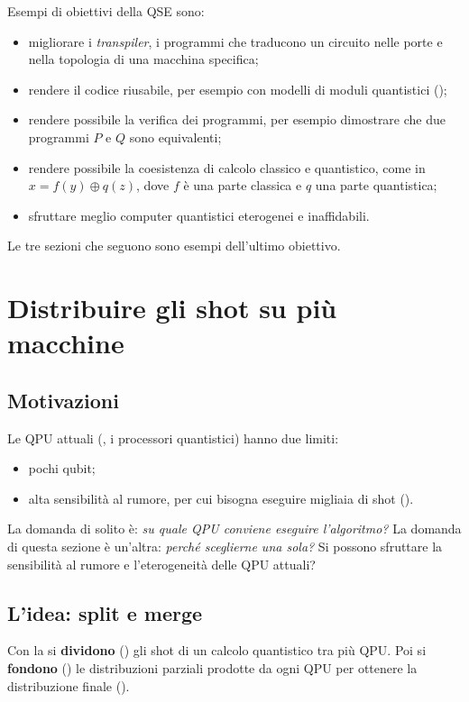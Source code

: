 Esempi di obiettivi della QSE sono:
\begin{itemize}
  \item migliorare i \emph{transpiler}, i programmi che traducono un circuito nelle porte e nella topologia di una
    macchina specifica;
  \item rendere il codice riusabile, per esempio con modelli di moduli quantistici ();
  \item rendere possibile la verifica dei programmi, per esempio dimostrare che due programmi $P$ e $Q$ sono
    equivalenti;
  \item rendere possibile la coesistenza di calcolo classico e quantistico, come in $x = f(y) \oplus q(z)$, dove $f$ è
    una parte classica e $q$ una parte quantistica;
  \item sfruttare meglio computer quantistici eterogenei e inaffidabili.
\end{itemize}
Le tre sezioni che seguono sono esempi dell'ultimo obiettivo.

\section{Distribuire gli shot su più macchine}
\label{sec:qse-shotwise}

\subsection{Motivazioni}

Le QPU attuali (, i processori quantistici) hanno due limiti:
\begin{itemize}
  \item pochi qubit;
  \item alta sensibilità al rumore, per cui bisogna eseguire migliaia di shot ().
\end{itemize}
La domanda di solito è: \emph{su quale QPU conviene eseguire l'algoritmo?} La domanda di questa sezione è un'altra:
\emph{perché sceglierne una sola?} Si possono sfruttare la sensibilità al rumore e l'eterogeneità delle QPU attuali?

\subsection{L'idea: split e merge}

\begin{definizione}
Con la  si \textbf{dividono} () gli shot di un calcolo quantistico tra più
QPU. Poi si \textbf{fondono} () le distribuzioni parziali prodotte da ogni QPU per ottenere la
distribuzione finale ().
\end{definizione}

